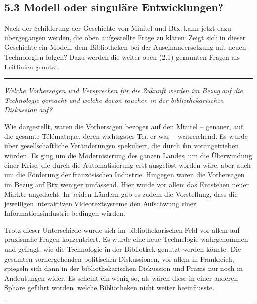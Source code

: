 \documentclass[a4paper,
fontsize=11pt,
oneside,
numbers=noperiodatend,
parskip=half-,
bibliography=totoc,
final
]{scrartcl}
\begin{document}
\hypertarget{modell-oder-singuluxe4re-entwicklungen}{%
\subsection{5.3 Modell oder singuläre
Entwicklungen?}\label{modell-oder-singuluxe4re-entwicklungen}}

Nach der Schilderung der Geschichte von Minitel und Btx, kann jetzt dazu
übergegangen werden, die oben aufgestellte Frage zu klären: Zeigt sich
in dieser Geschichte ein Modell, dem Bibliotheken bei der
Auseinandersetzung mit neuen Technologien folgen? Dazu werden die weiter
oben (2.1) genannten Fragen als Leitlinien genutzt.

\begin{center}\rule{0.5\linewidth}{0.5pt}\end{center}

\emph{Welche Vorhersagen und Versprechen für die Zukunft werden im Bezug
auf die Technologie gemacht und welche davon tauchen in der
bibliothekarischen Diskussion auf?}

Wie dargestellt, waren die Vorhersagen bezogen auf den Minitel --
genauer, auf die gesamte Télématique, deren wichtigster Teil er war --
weitreichend. Es wurde über gesellschaftliche Veränderungen spekuliert,
die durch ihn vorangetrieben würden. Es ging um die Modernisierung des
ganzen Landes, um die Überwindung einer Krise, die durch die
Automatisierung erst ausgelöst worden wäre, aber auch um die Förderung
der französischen Industrie. Hingegen waren die Vorhersagen im Bezug auf
Btx weniger umfassend. Hier wurde vor allem das Entstehen neuer Märkte
angedacht. In beiden Ländern gab es zudem die Vorstellung, dass die
jeweiligen interaktiven Videotextsysteme den Aufschwung einer
Informationsindustrie bedingen würden.

Trotz dieser Unterschiede wurde sich im bibliothekarischen Feld vor
allem auf praxisnahe Fragen konzentriert. Es wurde eine neue Technologie
wahrgenommen und gefragt, wie die Technologie in der Bibliothek genutzt
werden könnte. Die gesamten vorhergehenden politischen Diskussionen, vor
allem in Frankreich, spiegeln sich dann in der bibliothekarischen
Diskussion und Praxis nur noch in Andeutungen wider. Es scheint ein
wenig so, als wären diese in einer anderen Sphäre geführt worden, welche
Bibliotheken nicht weiter beeinflusste.

\begin{center}\rule{0.5\linewidth}{0.5pt}\end{center}
\end{document}
